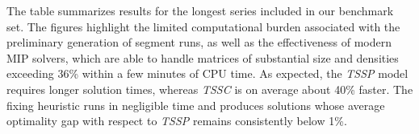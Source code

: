 \documentclass[preprints,article,submit,pdftex,moreauthors]{Definitions/mdpi}
\begin{document}
The table summarizes results for the longest series included in our benchmark set. The figures highlight the limited computational burden associated with the preliminary generation of segment runs, as well as the effectiveness of modern MIP solvers, which are able to handle matrices of substantial size and densities exceeding 36\% within a few minutes of CPU time. As expected, the {\it TSSP} model requires longer solution times, whereas {\it TSSC} is on average about 40\% faster. The fixing heuristic runs in negligible time and produces solutions whose average optimality gap with respect to {\it TSSP} remains consistently below 1\%.

\end{document}
